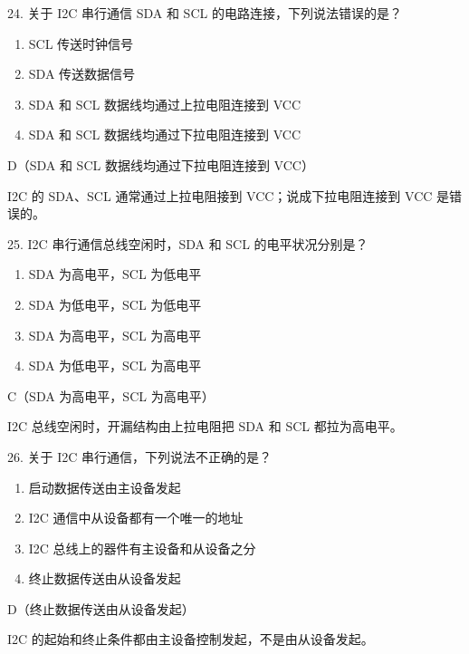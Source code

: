 \begin{question}{24. 关于 I2C 串行通信 SDA 和 SCL 的电路连接，下列说法错误的是？}
\begin{enumerate}[label=\Alph*., leftmargin=2.4em, itemsep=0.2em]
\item SCL 传送时钟信号
\item SDA 传送数据信号
\item SDA 和 SCL 数据线均通过上拉电阻连接到 VCC
\item SDA 和 SCL 数据线均通过下拉电阻连接到 VCC
\end{enumerate}
\end{question}
\begin{answer}
D（SDA 和 SCL 数据线均通过下拉电阻连接到 VCC）
\end{answer}
\begin{explanation}
I2C 的 SDA、SCL 通常通过上拉电阻接到 VCC；说成下拉电阻连接到 VCC 是错误的。
\end{explanation}

\begin{question}{25. I2C 串行通信总线空闲时，SDA 和 SCL 的电平状况分别是？}
\begin{enumerate}[label=\Alph*., leftmargin=2.4em, itemsep=0.2em]
\item SDA 为高电平，SCL 为低电平
\item SDA 为低电平，SCL 为低电平
\item SDA 为高电平，SCL 为高电平
\item SDA 为低电平，SCL 为高电平
\end{enumerate}
\end{question}
\begin{answer}
C（SDA 为高电平，SCL 为高电平）
\end{answer}
\begin{explanation}
I2C 总线空闲时，开漏结构由上拉电阻把 SDA 和 SCL 都拉为高电平。
\end{explanation}

\begin{question}{26. 关于 I2C 串行通信，下列说法不正确的是？}
\begin{enumerate}[label=\Alph*., leftmargin=2.4em, itemsep=0.2em]
\item 启动数据传送由主设备发起
\item I2C 通信中从设备都有一个唯一的地址
\item I2C 总线上的器件有主设备和从设备之分
\item 终止数据传送由从设备发起
\end{enumerate}
\end{question}
\begin{answer}
D（终止数据传送由从设备发起）
\end{answer}
\begin{explanation}
I2C 的起始和终止条件都由主设备控制发起，不是由从设备发起。
\end{explanation}


